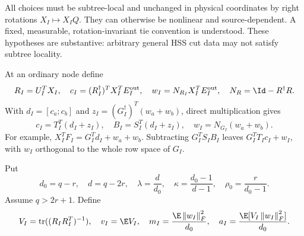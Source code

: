 \documentclass[11pt,oneside,openany,a4paper]{book}
\numberwithin{equation}{chapter}
\theoremstyle{definition}
\theoremstyle{remark}
\newcommand{\F}[1]{\left\lVert#1\right\rVert_F}
\DeclareMathOperator{\tr}{tr}\DeclareMathOperator{\rank}{rank}
\begin{document}
All choices must be subtree-local and unchanged in physical coordinates by right rotations $X_I\mapsto X_IQ$. They can otherwise be nonlinear and source-dependent. A fixed, measurable, rotation-invariant tie convention is understood. These hypotheses are substantive: arbitrary general HSS cut data may not satisfy subtree locality.

At an ordinary node define
\[
 R_I=U_I^TX_I,\quad
 c_I=(R_I^\dagger)^TX_I^TE_I^{\rm out},\quad
 w_I=N_{R_I}X_I^TE_I^{\rm out},\quad
 N_R=\Id-R^\dagger R.
\]
With $d_I=[c_a;c_b]$ and $z_I=(G_I^\dagger)^T(w_a+w_b)$, direct multiplication gives
\begin{equation}\label{core:eq:register}
 \boxed{c_I=T_I^T(d_I+z_I),\quad B_I=S_I^T(d_I+z_I),\quad
 w_I=N_{G_I}(w_a+w_b).}
\end{equation}
For example, $X_I^TF_I=G_I^Td_I+w_a+w_b$. Subtracting $G_I^TS_IB_I$ leaves $G_I^TT_Ic_I+w_I$, with $w_I$ orthogonal to the whole row space of $G_I$.

Put
\begin{equation}\label{core:eq:params}
 d_0=q-r,\quad d=q-2r,\quad
 \lambda=\frac d{d_0},\quad
 \kappa=\frac{d_0-1}{d-1},\quad
 \rho_0=\frac r{d_0-1}.
\end{equation}
Assume $q>2r+1$. Define
\[
 V_I=\tr((R_IR_I^T)^{-1}),\quad v_I=\E V_I,\quad
 m_I=\frac{\E\F{w_I}^2}{d_0},\quad
 a_I=\frac{\E[V_I\F{w_I}^2]}{d_0}.
\]
\end{document}
